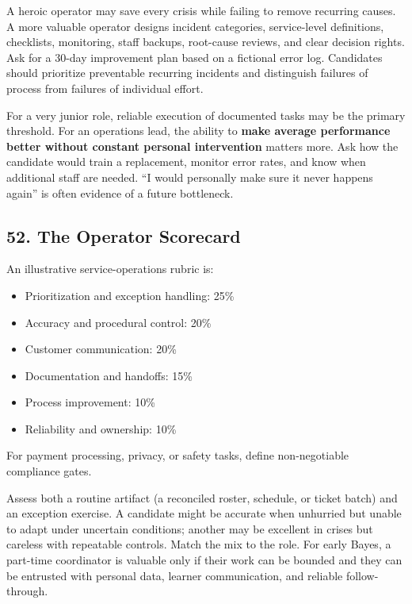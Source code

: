 A heroic operator may save every crisis while failing to remove recurring causes. A more valuable operator designs incident categories, service-level definitions, checklists, monitoring, staff backups, root-cause reviews, and clear decision rights. Ask for a 30-day improvement plan based on a fictional error log. Candidates should prioritize preventable recurring incidents and distinguish failures of process from failures of individual effort.

For a very junior role, reliable execution of documented tasks may be the primary threshold. For an operations lead, the ability to \textbf{make average performance better without constant personal intervention} matters more. Ask how the candidate would train a replacement, monitor error rates, and know when additional staff are needed. ``I would personally make sure it never happens again'' is often evidence of a future bottleneck.

\subsection*{52. The Operator Scorecard}

An illustrative service-operations rubric is:
\begin{itemize}[leftmargin=*]
\item Prioritization and exception handling: 25\%
\item Accuracy and procedural control: 20\%
\item Customer communication: 20\%
\item Documentation and handoffs: 15\%
\item Process improvement: 10\%
\item Reliability and ownership: 10\%
\end{itemize}
For payment processing, privacy, or safety tasks, define non-negotiable compliance gates.

Assess both a routine artifact (a reconciled roster, schedule, or ticket batch) and an exception exercise. A candidate might be accurate when unhurried but unable to adapt under uncertain conditions; another may be excellent in crises but careless with repeatable controls. Match the mix to the role. For early Bayes, a part-time coordinator is valuable only if their work can be bounded and they can be entrusted with personal data, learner communication, and reliable follow-through.
